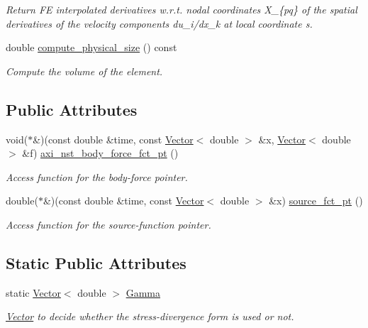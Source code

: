 \begin{DoxyCompactItemize}
\begin{DoxyCompactList}\small\item\em Return FE interpolated derivatives w.\+r.\+t. nodal coordinates X\+\_\+\{pq\} of the spatial derivatives of the velocity components du\+\_\+i/dx\+\_\+k at local coordinate s. \end{DoxyCompactList}\item 
double \hyperlink{classoomph_1_1AxisymmetricNavierStokesEquations_a37e908e68b52093af52ace8b0df0e173}{compute\+\_\+physical\+\_\+size} () const
\begin{DoxyCompactList}\small\item\em Compute the volume of the element. \end{DoxyCompactList}\end{DoxyCompactItemize}
\subsection*{Public Attributes}
\begin{DoxyCompactItemize}
\item 
void($\ast$\&)(const double \&time, const \hyperlink{classoomph_1_1Vector}{Vector}$<$ double $>$ \&x, \hyperlink{classoomph_1_1Vector}{Vector}$<$ double $>$ \&f) \hyperlink{classoomph_1_1AxisymmetricNavierStokesEquations_a11107d49963497a968799a6df6e6c015}{axi\+\_\+nst\+\_\+body\+\_\+force\+\_\+fct\+\_\+pt} ()
\begin{DoxyCompactList}\small\item\em Access function for the body-\/force pointer. \end{DoxyCompactList}\item 
double($\ast$\&)(const double \&time, const \hyperlink{classoomph_1_1Vector}{Vector}$<$ double $>$ \&x) \hyperlink{classoomph_1_1AxisymmetricNavierStokesEquations_a08d61d929d288c3584ebcab183ec68cc}{source\+\_\+fct\+\_\+pt} ()
\begin{DoxyCompactList}\small\item\em Access function for the source-\/function pointer. \end{DoxyCompactList}\end{DoxyCompactItemize}
\subsection*{Static Public Attributes}
\begin{DoxyCompactItemize}
\item 
static \hyperlink{classoomph_1_1Vector}{Vector}$<$ double $>$ \hyperlink{classoomph_1_1AxisymmetricNavierStokesEquations_aff943b6b83128398a0320cae90c6b94c}{Gamma}
\begin{DoxyCompactList}\small\item\em \hyperlink{classoomph_1_1Vector}{Vector} to decide whether the stress-\/divergence form is used or not. \end{DoxyCompactList}\end{DoxyCompactItemize}
